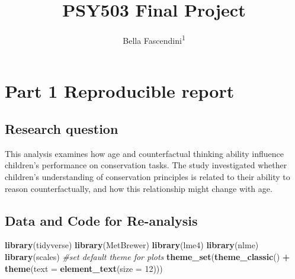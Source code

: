 \documentclass[
  doc]{apa6}
\title{PSY503 Final Project}
\author{Bella Fascendini\textsuperscript{1}}
\date{}
\affiliation{\phantom{0}}
\newenvironment{Shaded}{\begin{snugshade}}{\end{snugshade}}
\newcommand{\AttributeTok}[1]{\textcolor[rgb]{0.13,0.29,0.53}{#1}}
\newcommand{\CommentTok}[1]{\textcolor[rgb]{0.56,0.35,0.01}{\textit{#1}}}
\newcommand{\DecValTok}[1]{\textcolor[rgb]{0.00,0.00,0.81}{#1}}
\newcommand{\FunctionTok}[1]{\textcolor[rgb]{0.13,0.29,0.53}{\textbf{#1}}}
\newcommand{\NormalTok}[1]{#1}
\newcommand{\SpecialCharTok}[1]{\textcolor[rgb]{0.81,0.36,0.00}{\textbf{#1}}}
\begin{document}
\maketitle

\begin{Shaded}
\end{Shaded}

\section{Part 1 Reproducible report}\label{part-1-reproducible-report}

\subsection{Research question}\label{research-question}

This analysis examines how age and counterfactual thinking ability influence children's performance on conservation tasks. The study investigated whether children's understanding of conservation principles is related to their ability to reason counterfactually, and how this relationship might change with age.

\subsection{Data and Code for Re-analysis}\label{data-and-code-for-re-analysis}

\begin{Shaded}
\begin{Highlighting}[]
\FunctionTok{library}\NormalTok{(tidyverse)}
\FunctionTok{library}\NormalTok{(MetBrewer)}
\FunctionTok{library}\NormalTok{(lme4)}
\FunctionTok{library}\NormalTok{(nlme)}
\FunctionTok{library}\NormalTok{(scales)}
\CommentTok{\#set default theme for plots}
\FunctionTok{theme\_set}\NormalTok{(}\FunctionTok{theme\_classic}\NormalTok{() }\SpecialCharTok{+} 
            \FunctionTok{theme}\NormalTok{(}\AttributeTok{text =} \FunctionTok{element\_text}\NormalTok{(}\AttributeTok{size =} \DecValTok{12}\NormalTok{))) }
\end{Highlighting}
\end{Shaded}
\end{document}
